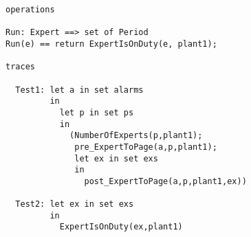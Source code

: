 \begin{lstlisting}  
operations

Run: Expert ==> set of Period
Run(e) == return ExpertIsOnDuty(e, plant1);

traces

  Test1: let a in set alarms
         in
           let p in set ps 
           in
             (NumberOfExperts(p,plant1);
              pre_ExpertToPage(a,p,plant1);
              let ex in set exs
              in
                post_ExpertToPage(a,p,plant1,ex))
               
  Test2: let ex in set exs
         in
           ExpertIsOnDuty(ex,plant1)
\end{lstlisting}  
